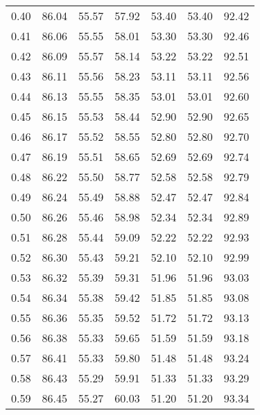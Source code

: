 \begin{tabular}{|c|c|c|c|c|c|c|}
      0.40 &     86.04 &     55.57 &      57.92 &   53.40 &      53.40 &         92.42 \\
      0.41 &     86.06 &     55.55 &      58.01 &   53.30 &      53.30 &         92.46 \\
      0.42 &     86.09 &     55.57 &      58.14 &   53.22 &      53.22 &         92.51 \\
      0.43 &     86.11 &     55.56 &      58.23 &   53.11 &      53.11 &         92.56 \\
      0.44 &     86.13 &     55.55 &      58.35 &   53.01 &      53.01 &         92.60 \\
      0.45 &     86.15 &     55.53 &      58.44 &   52.90 &      52.90 &         92.65 \\
      0.46 &     86.17 &     55.52 &      58.55 &   52.80 &      52.80 &         92.70 \\
      0.47 &     86.19 &     55.51 &      58.65 &   52.69 &      52.69 &         92.74 \\
      0.48 &     86.22 &     55.50 &      58.77 &   52.58 &      52.58 &         92.79 \\
      0.49 &     86.24 &     55.49 &      58.88 &   52.47 &      52.47 &         92.84 \\
      0.50 &     86.26 &     55.46 &      58.98 &   52.34 &      52.34 &         92.89 \\
      0.51 &     86.28 &     55.44 &      59.09 &   52.22 &      52.22 &         92.93 \\
      0.52 &     86.30 &     55.43 &      59.21 &   52.10 &      52.10 &         92.99 \\
      0.53 &     86.32 &     55.39 &      59.31 &   51.96 &      51.96 &         93.03 \\
      0.54 &     86.34 &     55.38 &      59.42 &   51.85 &      51.85 &         93.08 \\
      0.55 &     86.36 &     55.35 &      59.52 &   51.72 &      51.72 &         93.13 \\
      0.56 &     86.38 &     55.33 &      59.65 &   51.59 &      51.59 &         93.18 \\
      0.57 &     86.41 &     55.33 &      59.80 &   51.48 &      51.48 &         93.24 \\
      0.58 &     86.43 &     55.29 &      59.91 &   51.33 &      51.33 &         93.29 \\
      0.59 &     86.45 &     55.27 &      60.03 &   51.20 &      51.20 &         93.34 \\

\end{tabular}
